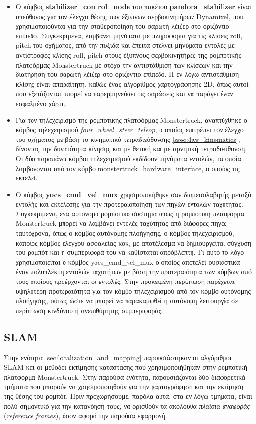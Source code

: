 \begin{itemize}
	\item Ο κόμβος \textbf{stabilizer{\_}control{\_}node} του πακέτου \textbf{pandora{\_}stabilizer} είναι υπεύθυνος για τον έλεγχο θέσης των έξυπνων σερβοκινητήρων Dynamixel, που χρησιμοποιούνται για την σταθεροποίηση του σαρωτή λέιζερ στο οριζόντιο επίπεδο. Συγκεκριμένα, λαμβάνει μηνύματα με πληροφορία για τις κλίσεις roll, pitch του οχήματος, από την πυξίδα και έπειτα στέλνει μηνύματα-εντολές με αντίστροφες κλίσης roll, pitch στους έξυπνους σερβοκινητήρες της ρομποτικής πλατφόρμας Monstertruck με στόχο την αντιστάθμιση των κλίσεων και την διατήρηση του σαρωτή λέιζερ στο οριζόντιο επίπεδο. Η εν λόγω αντιστάθμιση κλίσης είναι απαραίτητη, καθώς ένας αλγόριθμος χαρτογράφησης 2D, όπως αυτοί που εξετάζονται μπορεί να παρερμηνεύσει τις σαρώσεις και να παράγει έναν εσφαλμένο χάρτη.
	\item Για τον τηλεχειρισμό της ρομποτικής πλατφόρμας Monstertruck, αναπτύχθηκε ο κόμβος τηλεχειρισμού \textit{four{\_}wheel{\_}steer{\_}teleop}, ο οποίος επιτρέπει τον έλεγχο του οχήματος με βάση το κινηματικό τετραδιεύθυνσης \ref{ssec:4ws_kinematics}, δίνοντας την δυνατότητα κίνησης και με θετική και με αρνητική τετραδιεύθυνση. Οι δύο παραπάνω κόμβοι τηλεχειρισμού εκδίδουν μηνύματα εντολών, τα οποία λαμβάνονται από τον κόμβο monstertruck{\_}hardware{\_}interface, ο οποίος τις  εκτελεί.	
	\item Ο κόμβος \textbf{yocs{\_}cmd{\_}vel{\_}mux} \cite{yocs_cmd_vel_mux} χρησιμοποιήθηκε σαν διαμεσολαβητής μεταξύ εντολής και εκτέλεσης για την προτεραιοποίηση των πηγών εντολών ταχύτητας. Συγκεκριμένα, ένα αυτόνομο ρομποτικό σύστημα όπως η ρομποτική πλατφόρμα Monstertruck μπορεί να λαμβάνει εντολές ταχύτητας από διάφορες πηγές ταυτόχρονα, όπως ο κόμβος αυτόνομης πλοήγησης, ο κόμβος τηλεχειρισμού, κάποιος κόμβος ελέγχου ασφαλείας κοκ, με αποτέλεσμα να δημιουργείται σύγχυση του ρομπότ και η συμπεριφορά του να καθίσταται απρόβλεπτη. Γι αυτό το λόγο χρησιμοποιείται ο κόμβος yocs{\_}cmd{\_}vel{\_}mux ο οποίος αποτελεί ουσιαστικά έναν πολυπλέκτη εντολών ταχυτήτων με βάση την προτεραιότητα των κόμβων από τους οποίους προέρχονται οι εντολές. Στην προκειμένη περίπτωση παρέχεται υψηλότερη προτεραιότητα για τον κόμβο τηλεχειρισμού από τον κόμβο αυτόνομης πλοήγησης, ούτως ώστε να μπορεί να παρακαμφθεί η αυτόνομη λειτουργία σε περίπτωση κινδύνου ή ανεπιθύμητης συμπεριφοράς.
\end{itemize}

\subsection{SLAM} \label{ssec:slam_components}
Στην ενότητα \ref{sec:localization_and_mapping} παρουσιάστηκαν οι αλγόριθμοι SLAM και οι μέθοδοι εκτίμησης κατάστασης που χρησιμοποιήθηκαν στην ρομποτική πλατφόρμα Monstertruck. Στην παρούσα ενότητα, παρουσιάζονται δύο διαφορετικά τμήματα που μπορούν να χρησιμοποιηθούν για την χαρτογράφηση και την εκτίμηση της θέσης του ρομπότ. Πριν προχωρήσουμε, παρόλα αυτά, στα εν λόγω τμήματα, είναι πολύ σημαντικό για την κατανόηση τους, να ορισθούν τα ακόλουθα \textit{πλαίσια αναφοράς} (\textit{reference frames}), όσον αφορά την παρούσα εφαρμογή.

